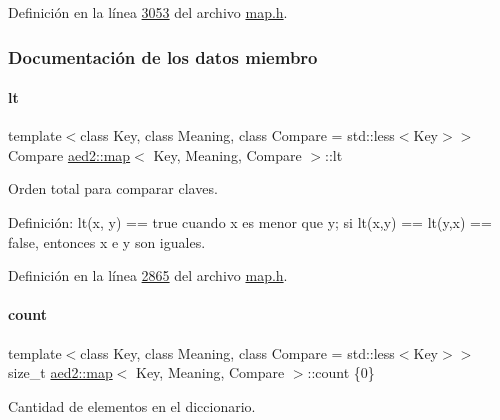 Definición en la línea \hyperlink{map_8h_source_l03053}{3053} del archivo \hyperlink{map_8h_source}{map.\+h}.



\subsubsection{Documentación de los datos miembro}
\mbox{\label{classaed2_1_1map_a0e5be36fae0693e4665bd2a615e7550a_a0e5be36fae0693e4665bd2a615e7550a}} 
\paragraph{\texorpdfstring{lt}{lt}}
{\footnotesize\ttfamily template$<$class Key, class Meaning, class Compare = std\+::less$<$\+Key$>$$>$ \\
Compare \hyperlink{classaed2_1_1map}{aed2\+::map}$<$ Key, Meaning, Compare $>$\+::lt\hspace{0.3cm}{\ttfamily [private]}}



Orden total para comparar claves. 

Definición\+: lt(x, y) == true cuando x es menor que y; si lt(x,y) == lt(y,x) == false, entonces x e y son iguales. 

Definición en la línea \hyperlink{map_8h_source_l02865}{2865} del archivo \hyperlink{map_8h_source}{map.\+h}.

\mbox{\label{classaed2_1_1map_a44236c4f16cdc20a10759862b198bde4_a44236c4f16cdc20a10759862b198bde4}} 
\paragraph{\texorpdfstring{count}{count}}
{\footnotesize\ttfamily template$<$class Key, class Meaning, class Compare = std\+::less$<$\+Key$>$$>$ \\
size\+\_\+t \hyperlink{classaed2_1_1map}{aed2\+::map}$<$ Key, Meaning, Compare $>$\+::count \{0\}\hspace{0.3cm}{\ttfamily [private]}}



Cantidad de elementos en el diccionario. 



